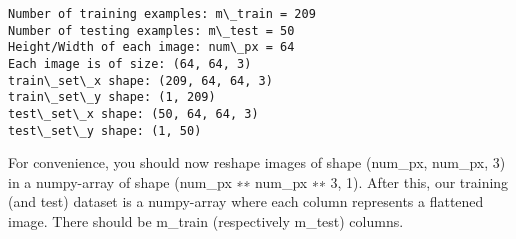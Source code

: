 \documentclass[11pt]{article}
\begin{document}
    \begin{Verbatim}[commandchars=\\\{\}]
Number of training examples: m\_train = 209
Number of testing examples: m\_test = 50
Height/Width of each image: num\_px = 64
Each image is of size: (64, 64, 3)
train\_set\_x shape: (209, 64, 64, 3)
train\_set\_y shape: (1, 209)
test\_set\_x shape: (50, 64, 64, 3)
test\_set\_y shape: (1, 50)

    \end{Verbatim}

    For convenience, you should now reshape images of shape (num\_px,
num\_px, 3) in a numpy-array of shape (num\_px ∗∗ num\_px ∗∗ 3, 1).
After this, our training (and test) dataset is a numpy-array where each
column represents a flattened image. There should be m\_train
(respectively m\_test) columns.
\end{document}
